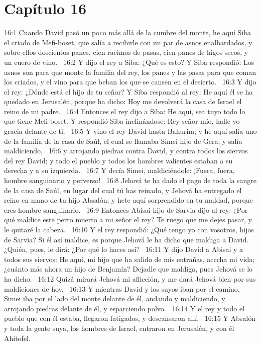 \section*{Capítulo 16 }
16:1 Cuando David pasó un poco más allá de la cumbre del monte, he aquí Siba el criado de Mefi-boset, que salía a recibirle con un par de asnos enalbardados, y sobre ellos doscientos panes, cien racimos de pasas, cien panes de higos secos, y un cuero de vino.  
16:2 Y dijo el rey a Siba: ¿Qué es esto? Y Siba respondió: Los asnos son para que monte la familia del rey, los panes y las pasas para que coman los criados, y el vino para que beban los que se cansen en el desierto.  
16:3 Y dijo el rey: ¿Dónde está el hijo de tu señor? Y Siba respondió al rey: He aquí él se ha quedado en Jerusalén, porque ha dicho: Hoy me devolverá la casa de Israel el reino de mi padre.  
16:4 Entonces el rey dijo a Siba: He aquí, sea tuyo todo lo que tiene Mefi-boset. Y respondió Siba inclinándose: Rey señor mío, halle yo gracia delante de ti.  
16:5 Y vino el rey David hasta Bahurim; y he aquí salía uno de la familia de la casa de Saúl, el cual se llamaba Simei hijo de Gera; y salía maldiciendo,  
16:6 y arrojando piedras contra David, y contra todos los siervos del rey David; y todo el pueblo y todos los hombres valientes estaban a su derecha y a su izquierda.  
16:7 Y decía Simei, maldiciéndole: ¡Fuera, fuera, hombre sanguinario y perverso!  
16:8 Jehová te ha dado el pago de toda la sangre de la casa de Saúl, en lugar del cual tú has reinado, y Jehová ha entregado el reino en mano de tu hijo Absalón; y hete aquí sorprendido en tu maldad, porque eres hombre sanguinario.  
16:9 Entonces Abisai hijo de Sarvia dijo al rey: ¿Por qué maldice este perro muerto a mi señor el rey? Te ruego que me dejes pasar, y le quitaré la cabeza.  
16:10 Y el rey respondió: ¿Qué tengo yo con vosotros, hijos de Sarvia? Si él así maldice, es porque Jehová le ha dicho que maldiga a David. ¿Quién, pues, le dirá: ¿Por qué lo haces así?  
16:11 Y dijo David a Abisai y a todos sus siervos: He aquí, mi hijo que ha salido de mis entrañas, acecha mi vida; ¿cuánto más ahora un hijo de Benjamín? Dejadle que maldiga, pues Jehová se lo ha dicho.  
16:12 Quizá mirará Jehová mi aflicción, y me dará Jehová bien por sus maldiciones de hoy.  
16:13 Y mientras David y los suyos iban por el camino, Simei iba por el lado del monte delante de él, andando y maldiciendo, y arrojando piedras delante de él, y esparciendo polvo.  
16:14 Y el rey y todo el pueblo que con él estaba, llegaron fatigados, y descansaron allí.  
16:15 Y Absalón y toda la gente suya, los hombres de Israel, entraron en Jerusalén, y con él Ahitofel.  
